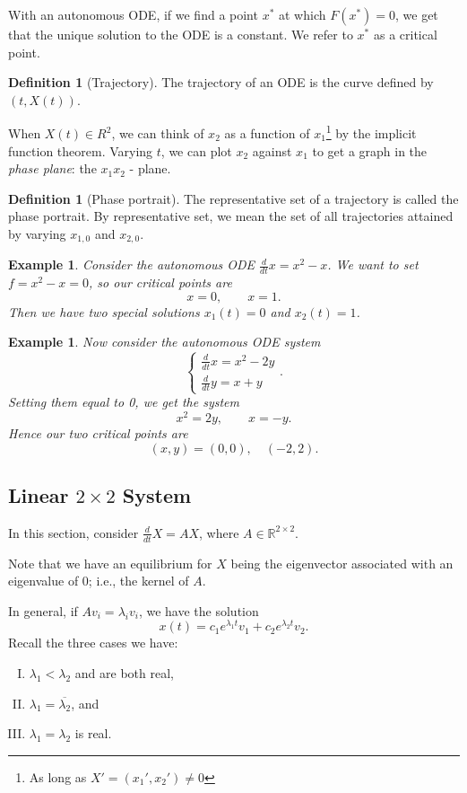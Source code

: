 \documentclass{tufte-handout}
\newcommand*\R{\mathbb{R}}
\newtheorem{ex}[thm]{Example}
\theoremstyle{definition}
\newtheorem{defn}[thm]{Definition}
\begin{document}
With an autonomous ODE, if we find a point $x^*$ at which $F(x^*) = 0$, we get that the unique solution to the ODE is a constant. We refer to $x^*$ as a critical point.

\begin{defn}[Trajectory]
	The trajectory of an ODE is the curve defined by $(t,X(t))$.
\end{defn}

When $X(t) \in R^2$, we can think of $x_2$ as a function of $x_1$\footnote{As long as $X' = \left( x_1',x_2' \right) \ne 0$} by the implicit function theorem.
Varying $t$, we can plot $x_2$ against $x_1$ to get a graph in the \emph{phase plane}: the $x_1$$x_2$ - plane.

\begin{defn}[Phase portrait]
	The representative set of a trajectory is called the phase portrait. By representative set, we mean the set of all trajectories attained by varying $x_{1,0}$ and $x_{2,0}$.
\end{defn}

\begin{ex}
	Consider the autonomous ODE $\frac{d}{dt}x = x^2- x$. We want to set $f = x^2 - x = 0$, so our critical points are \[
		x = 0, \qquad x = 1
	.\] Then we have two special solutions $x_1(t) = 0$ and $x_2(t)=1$.
\end{ex}

\begin{ex}
	Now consider the autonomous ODE system \[
		\begin{cases}
			\frac{d}{dt}x = x^2 - 2y \\
			\frac{d}{dt}y = x + y
		\end{cases}
	.\] Setting them equal to 0, we get the system \[
		x^2 = 2y, \qquad x = -y
	.\] Hence our two critical points are \[
	(x,y) = (0,0), \quad (-2, 2)
	.\] 
\end{ex}

\subsection{Linear $2\times 2$ System}

In this section, consider $\frac{d}{dt} X = AX$, where $A \in \R^{2\times 2}$.

Note that we have an equilibrium for $X$ being the eigenvector associated with an eigenvalue of $0$; i.e., the kernel of $A$.

In general, if $Av_i = \lambda_i v_i$, we have the solution \[
	x(t) = c_1e^{\lambda_1 t}v_1 + c_2 e^{\lambda_2 t}v_2
.\] Recall the three cases we have:
\begin{enumerate}[(I)]
	\item $\lambda_1 < \lambda_2$ and are both real,
	\item $\lambda_1 = \overline{\lambda_2}$, and
	\item $\lambda_1=\lambda_2$ is real.
\end{enumerate}
\end{document}
